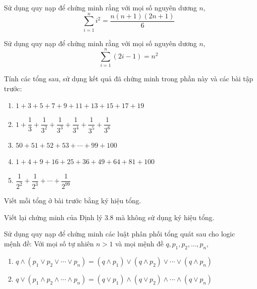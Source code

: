 \begin{exercise}
Sử dụng quy nạp để chứng minh rằng với mọi số nguyên dương $n$,
\[\sum_{i=1}^{n} i^2 = \frac{n(n+1)(2n+1)}{6}\]
\end{exercise}

\begin{exercise}
Sử dụng quy nạp để chứng minh rằng với mọi số nguyên dương $n$,
\[\sum_{i=1}^{n} (2i - 1) = n^2\]
\end{exercise}

\begin{exercise}
Tính các tổng sau, sử dụng kết quả đã chứng minh trong phần này và các bài tập trước:
\begin{enumerate}[label=\alph*)]
\item $1 + 3 + 5 + 7 + 9 + 11 + 13 + 15 + 17 + 19$
\item $1 + \dfrac{1}{3} + \dfrac{1}{3^2} + \dfrac{1}{3^3} + \dfrac{1}{3^4} + \dfrac{1}{3^5} + \dfrac{1}{3^6}$
\item $50 + 51 + 52 + 53 + \cdots + 99 + 100$
\item $1 + 4 + 9 + 16 + 25 + 36 + 49 + 64 + 81 + 100$
\item $\dfrac{1}{2^2} + \dfrac{1}{2^3} + \cdots + \dfrac{1}{2^{99}}$
\end{enumerate}
\end{exercise}

\begin{exercise}
Viết mỗi tổng ở bài trước bằng ký hiệu tổng.
\end{exercise}

\begin{exercise}
Viết lại chứng minh của Định lý 3.8 mà không sử dụng ký hiệu tổng.
\end{exercise}

\begin{exercise}
Sử dụng quy nạp để chứng minh các luật phân phối tổng quát sau cho logic mệnh đề: Với mọi số tự nhiên $n > 1$ và mọi mệnh đề $q, p_1, p_2, \ldots, p_n$,
\begin{enumerate}[label=\alph*)]
\item $q \wedge (p_1 \vee p_2 \vee \cdots \vee p_n) = (q \wedge p_1) \vee (q \wedge p_2) \vee \cdots \vee (q \wedge p_n)$
\item $q \vee (p_1 \wedge p_2 \wedge \cdots \wedge p_n) = (q \vee p_1) \wedge (q \vee p_2) \wedge \cdots \wedge (q \vee p_n)$
\end{enumerate}
\end{exercise}

